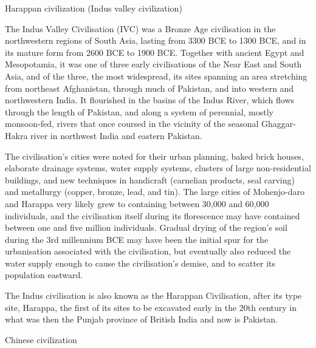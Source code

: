 \documentclass[
  openany]{book}
\begin{document}
Harappan civilization (Indus valley civilization)

The Indus Valley Civilisation (IVC) was a Bronze Age civilisation in the northwestern regions of South Asia, lasting from 3300 BCE to 1300 BCE, and in its mature form from 2600 BCE to 1900 BCE. Together with ancient Egypt and Mesopotamia, it was one of three early civilisations of the Near East and South Asia, and of the three, the most widespread, its sites spanning an area stretching from northeast Afghanistan, through much of Pakistan, and into western and northwestern India. It flourished in the basins of the Indus River, which flows through the length of Pakistan, and along a system of perennial, mostly monsoon-fed, rivers that once coursed in the vicinity of the seasonal Ghaggar-Hakra river in northwest India and eastern Pakistan.

The civilisation's cities were noted for their urban planning, baked brick houses, elaborate drainage systems, water supply systems, clusters of large non-residential buildings, and new techniques in handicraft (carnelian products, seal carving) and metallurgy (copper, bronze, lead, and tin). The large cities of Mohenjo-daro and Harappa very likely grew to containing between 30,000 and 60,000 individuals, and the civilisation itself during its florescence may have contained between one and five million individuals. Gradual drying of the region's soil during the 3rd millennium BCE may have been the initial spur for the urbanisation associated with the civilisation, but eventually also reduced the water supply enough to cause the civilisation's demise, and to scatter its population eastward.

The Indus civilisation is also known as the Harappan Civilisation, after its type site, Harappa, the first of its sites to be excavated early in the 20th century in what was then the Punjab province of British India and now is Pakistan.

Chinese civilization
\end{document}
